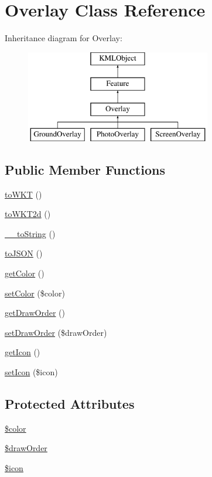 \hypertarget{classOverlay}{
\section{Overlay Class Reference}
\label{d3/d05/classOverlay}
}
Inheritance diagram for Overlay:\begin{figure}[H]
\begin{center}
\leavevmode
\includegraphics[height=4.000000cm]{d3/d05/classOverlay}
\end{center}
\end{figure}
\subsection*{Public Member Functions}
\begin{DoxyCompactItemize}
\item 
\hyperlink{classOverlay_a6cb3759afc603e96c0eb9fd4bb01955e}{toWKT} ()
\item 
\hyperlink{classOverlay_aa6c65135e22032c45c61a88e44809da5}{toWKT2d} ()
\item 
\hyperlink{classOverlay_ac17d92076f83e40cb43ccd108e65533b}{\_\-\_\-toString} ()
\item 
\hyperlink{classOverlay_a118abf34a9854394b068cbc5836e3527}{toJSON} ()
\item 
\hyperlink{classOverlay_a115f11a5ead3e8e2e9a7e68f44ac776e}{getColor} ()
\item 
\hyperlink{classOverlay_ad60daaf68672a7d6009e56b175bbf1e2}{setColor} (\$color)
\item 
\hyperlink{classOverlay_a04ab334eedb372e43841af3f2273d47c}{getDrawOrder} ()
\item 
\hyperlink{classOverlay_a3ff9f2666da2a382a063e3a8ece909af}{setDrawOrder} (\$drawOrder)
\item 
\hyperlink{classOverlay_a1b060f6a3432f2075440163300086b35}{getIcon} ()
\item 
\hyperlink{classOverlay_ac57f26b6e53774a7b41ebf40f18ae6ba}{setIcon} (\$icon)
\end{DoxyCompactItemize}
\subsection*{Protected Attributes}
\begin{DoxyCompactItemize}
\item 
\hyperlink{classOverlay_a532fb4c7e06dada682bc0907df59b9c9}{\$color}
\item 
\hyperlink{classOverlay_ac28f33c36076ec5bd4f4726f4cafdbfa}{\$drawOrder}
\item 
\hyperlink{classOverlay_a5540a8d829324b8123a1712dc4984952}{\$icon}
\end{DoxyCompactItemize}


